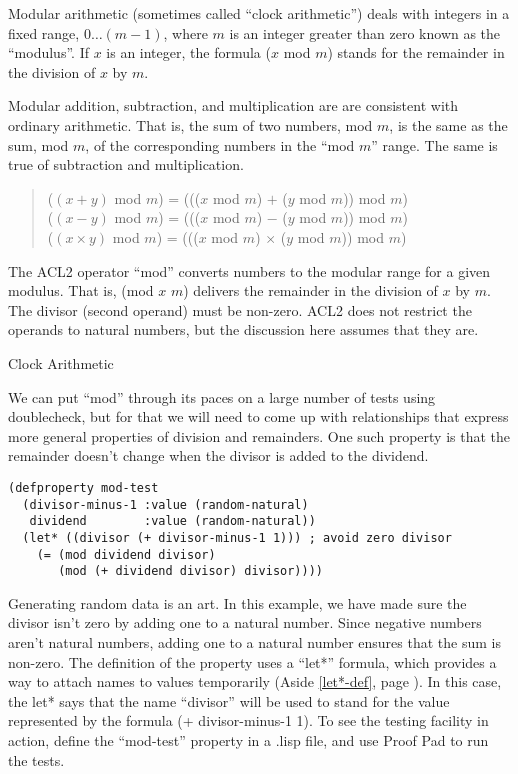 \begin{aside}
Modular arithmetic (sometimes called ``clock arithmetic'')
deals with integers in a fixed range, $0 \dots (m - 1)$,
where $m$ is an integer greater than zero known as
the ``modulus''.
If $x$ is an integer, the formula ($x$ mod $m$) stands for
the remainder in the division of $x$ by $m$.

Modular addition, subtraction, and multiplication are
are consistent with ordinary arithmetic.
That is, the sum of two numbers, mod $m$,
is the same as the sum, mod $m$, of the corresponding numbers
in the ``mod $m$'' range.
The same is true of subtraction and multiplication.

\begin{quote}
($(x + y)$ mod $m$) = ((($x$ mod $m$) $+$ ($y$ mod $m$)) mod $m$) \\
($(x - y)$ mod $m$) = ((($x$ mod $m$) $-$ ($y$ mod $m$)) mod $m$) \\
($(x \times y)$ mod $m$) = ((($x$ mod $m$) $\times$ ($y$ mod $m$)) mod $m$)
\end{quote}

The ACL2 operator ``mod'' converts numbers to the modular range
for a given modulus. That is, (mod $x$ $m$) delivers the remainder
in the division of $x$ by $m$.
The divisor (second operand) must be non-zero.
ACL2 does not restrict the operands to natural numbers,
but the discussion here assumes that they are.
\caption{Clock Arithmetic}
\label{modular-arithmetic}
\end{aside}

We can put ``mod''
through its paces on a large number of tests using doublecheck,
but for that we will need to come up with relationships
that express more general properties of division and remainders.
One such property is that the remainder doesn't change
when the divisor is added to the dividend.

\begin{Verbatim}
(defproperty mod-test
  (divisor-minus-1 :value (random-natural)
   dividend        :value (random-natural))
  (let* ((divisor (+ divisor-minus-1 1))) ; avoid zero divisor
    (= (mod dividend divisor)
       (mod (+ dividend divisor) divisor))))
\end{Verbatim}

Generating random data is an art.
In this example, we have made sure the divisor isn't zero
by adding one to a natural number.
Since negative numbers aren't natural numbers, adding one
to a natural number ensures that the sum is non-zero.
\label{let-example-brief-explain}
The definition of the property uses a ``let*'' formula,
which provides a way to attach names to values temporarily
(Aside \ref{let*-def}, page \pageref{let*-def}).
In this case, the let* says that
the name ``divisor'' will be used to stand for
the value represented by the formula (+ divisor-minus-1 1).
To see the testing facility in action,
define the ``mod-test'' property in a .lisp file,
and use Proof Pad to run the tests.

